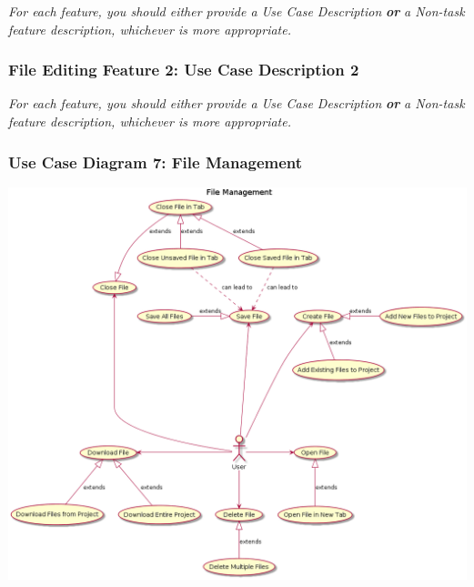 \documentclass[twoside,letterpaper]{article}
\begin{document}
{\color{black}
	\foreignlanguage{english}{\textit{For each feature, you should either provide a Use Case Description
		}}\foreignlanguage{english}{\textbf{\textit{or}}}\foreignlanguage{english}{\textit{ a Non-task feature description,
		whichever is more appropriate.}}}
\newpage

\subsubsection[File Editing Feature 2: Use Case Description 2]{\rmfamily\bfseries\color{black}
	File Editing Feature 2: Use Case Description 2}
\hypertarget{RefHeading22059017292}{}
\bigskip

{\color{black}
	\foreignlanguage{english}{\textit{For each feature, you should either provide a Use Case Description
		}}\foreignlanguage{english}{\textbf{\textit{or}}}\foreignlanguage{english}{\textit{ a Non-task feature description,
		whichever is more appropriate.}}}
\newpage

\subsubsection[Use Case Diagram 7: File Management]{\rmfamily\bfseries\color{black}
	Use Case Diagram 7: File Management}

\includegraphics[width=\textwidth]{images/UseCases/FileManagement}
\end{document}
